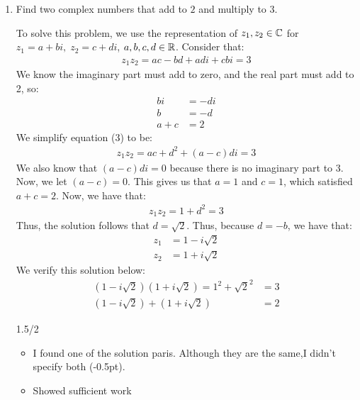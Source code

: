 \begin{enumerate}
    \item Find two complex numbers that add to $2$ and multiply to $3$.
    \begin{problem}
        To solve this problem, we use the representation of $z_1, z_2\in\mathbb{C}$ for $z_1 = a+bi, \;z_2 = c + di$, $a,b,c,d\in\mathbb{R}$. \gline{}
        Consider that:
        \begin{align}
            z_1z_2 = ac - bd + adi + cbi=3
        \end{align}
        We know the imaginary part must add to zero, and the real part must add to 2, so:
        \begin{align*}
            bi &= -di\\
            b &= -d\\
            a + c &= 2
        \end{align*}
        We simplify equation (3) to be:
        \begin{align}
            z_1z_2 = ac + d^2 + (a-c)di=3
        \end{align}
        We also know that $(a-c)di = 0$ because there is no imaginary part to 3. Now, we let $(a-c) = 0$. This gives us that $a = 1$ and $c = 1$, which satisfied $a+c =2$. Now, we have that:
        \begin{align*}
            z_1z_2 = 1 + d^2 = 3
        \end{align*}
        Thus, the solution follows that $d = \sqrt{2}$. Thus, because $d = -b$, we have that:
        \begin{align*}
            z_1 &= 1 - i \sqrt{2}\\
            z_2 &= 1 + i \sqrt{2}
        \end{align*}
        We verify this solution below:
        \begin{align*}
            (1-i\sqrt{2})(1+i\sqrt{2})=1^2 + \sqrt{2}^2&= 3\\
            (1-i\sqrt{2}) + (1+i\sqrt{2})&= 2
        \end{align*}
    \end{problem}
    \begin{grade}
        1.5/2
        \begin{itemize}[itemsep=0pt, parsep=0pt]
            \item I found one of the solution paris. Although they are the same,I didn't specify both (-0.5pt).
            \item Showed sufficient work
        \end{itemize}
    \end{grade}
\end{enumerate}



